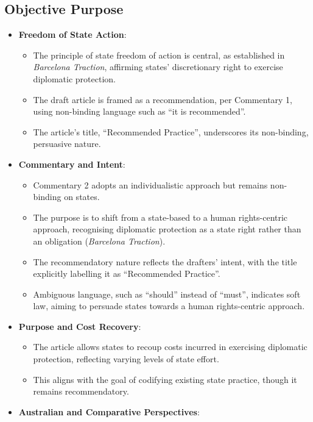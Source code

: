 \subsection{Objective Purpose}
\begin{itemize}
    \item \textbf{Freedom of State Action}:
    \begin{itemize}
        \item The principle of state freedom of action is central, as established in \textit{Barcelona Traction}, affirming states' discretionary right to exercise diplomatic protection.
        \item The draft article is framed as a recommendation, per Commentary 1, using non-binding language such as ``it is recommended''.
        \item The article's title, ``Recommended Practice'', underscores its non-binding, persuasive nature.
    \end{itemize}
    \item \textbf{Commentary and Intent}:
    \begin{itemize}
        \item Commentary 2 adopts an individualistic approach but remains non-binding on states.
        \item The purpose is to shift from a state-based to a human rights-centric approach, recognising diplomatic protection as a state right rather than an obligation (\textit{Barcelona Traction}).
        \item The recommendatory nature reflects the drafters' intent, with the title explicitly labelling it as ``Recommended Practice''.
        \item Ambiguous language, such as ``should'' instead of ``must'', indicates soft law, aiming to persuade states towards a human rights-centric approach.
    \end{itemize}
    \item \textbf{Purpose and Cost Recovery}:
    \begin{itemize}
        \item The article allows states to recoup costs incurred in exercising diplomatic protection, reflecting varying levels of state effort.
        \item This aligns with the goal of codifying existing state practice, though it remains recommendatory.
    \end{itemize}
    \item \textbf{Australian and Comparative Perspectives}:

\end{itemize}
